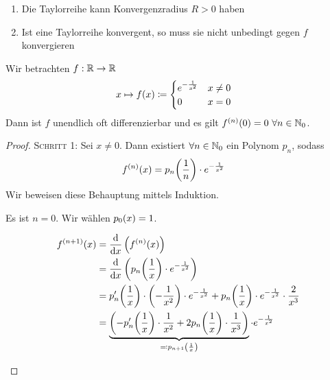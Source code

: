 \begin{bemerkung}
    \theoremescape
    \begin{enumerate}[label=(\roman*)]
        \item Die Taylorreihe kann Konvergenzradius $R > 0$ haben
        \item Ist eine Taylorreihe konvergent, so muss sie nicht unbedingt gegen $f$ konvergieren
    \end{enumerate}
\end{bemerkung}

\begin{beispiel}
    Wir betrachten $f: \mathbb{R}\rightarrow{}\mathbb{R}$
    \begin{align*}
        x\mapsto f\of{x}&\coloneqq \begin{cases}
                                       e^{-\frac{1}{x^2}} & x\neq 0\\
                                       0 &x=0
        \end{cases}
    \end{align*}
    Dann ist $f$ unendlich oft differenzierbar und es gilt $f^{(n)}\of{0} = 0~\forall n\in\N_0$.
    \begin{proof}
        \textsc{Schritt 1}: Sei $x\neq 0$. Dann existiert $\forall n\in\mathbb{N}_0$ ein Polynom $p_n$, sodass
        \begin{align*}
            f^{(n)}\of{x} &= p_n\of{\frac{1}{n}}\cdot e^{-\frac{1}{x^2}}
        \end{align*}
        Wir beweisen diese Behauptung mittels Induktion.~\\
        \begin{induktionsanfang}
            Es ist $n=0$. Wir wählen $p_0\of{x} = 1$.
        \end{induktionsanfang}
        \begin{induktionsschritt}
            \begin{align*}
                f^{(n+1)}\of{x} &= \frac{\dif}{\dif x}\pair{f^{(n)}\of{x}}\\
                &= \frac{\dif}{\dif x}\pair{p_n\of{\frac{1}{x}}\cdot e^{-\frac{1}{x^2}}}\\
                &= p_n'\of{\frac{1}{x}}\cdot\pair{-\frac{1}{x^2}}\cdot e^{-\frac{1}{x^2}} + p_n\of{\frac{1}{x}}\cdot e^{-\frac{1}{x^2}}\cdot\frac{2}{x^3}\\
                &= \underbrace{\pair{-p_n'\of{\frac{1}{x}}\cdot\frac{1}{x^2} + 2p_n\of{\frac{1}{x}}\cdot\frac{1}{x^3}}}_{\definedasbackwards p_{n+1}\of{\frac{1}{x}}}\cdot e^{-\frac{1}{x^2}}\\

\end{align*}
\end{induktionsschritt}
\end{proof}
\end{beispiel}
